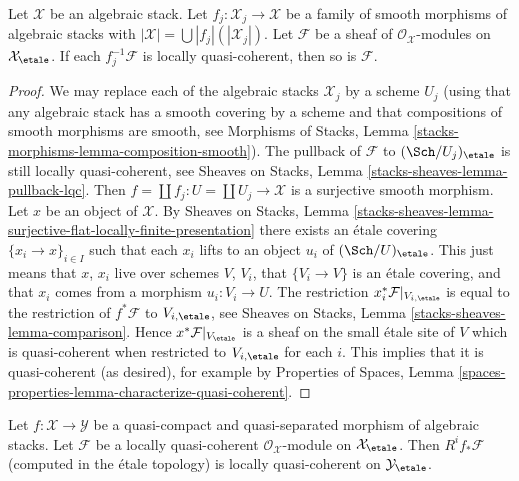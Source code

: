 \begin{lemma}
\label{lemma-check-lqc-on-etale-covering}
Let $\mathcal{X}$ be an algebraic stack. Let
$f_j : \mathcal{X}_j \to \mathcal{X}$ be a family of smooth
morphisms of algebraic stacks with
$|\mathcal{X}| =\bigcup |f_j|(|\mathcal{X}_j|)$.
Let $\mathcal{F}$ be a sheaf of $\mathcal{O}_\mathcal{X}$-modules
on $\mathcal{X}_\etale$. If each $f_j^{-1}\mathcal{F}$
is locally quasi-coherent, then so is $\mathcal{F}$.
\end{lemma}

\begin{proof}
We may replace each of the algebraic stacks $\mathcal{X}_j$ by
a scheme $U_j$ (using that any algebraic stack has a smooth covering by
a scheme and that compositions of smooth morphisms are smooth, see
Morphisms of Stacks, Lemma \ref{stacks-morphisms-lemma-composition-smooth}).
The pullback of $\mathcal{F}$ to $(\Sch/U_j)_\etale$ is still
locally quasi-coherent, see
Sheaves on Stacks, Lemma \ref{stacks-sheaves-lemma-pullback-lqc}.
Then $f = \coprod f_j : U = \coprod U_j \to \mathcal{X}$ is a surjective
smooth morphism. Let $x$ be an object of $\mathcal{X}$. By
Sheaves on Stacks, Lemma
\ref{stacks-sheaves-lemma-surjective-flat-locally-finite-presentation}
there exists an \'etale covering $\{x_i \to x\}_{i \in I}$
such that each $x_i$ lifts to an object $u_i$ of $(\Sch/U)_\etale$.
This just means that $x$, $x_i$ live over schemes $V$, $V_i$, that
$\{V_i \to V\}$ is an \'etale covering, and that $x_i$ comes from
a morphism $u_i : V_i \to U$. The restriction
$x_i^*\mathcal{F}|_{V_{i, \etale}}$ is equal to the restriction
of $f^*\mathcal{F}$ to $V_{i, \etale}$, see
Sheaves on Stacks, Lemma \ref{stacks-sheaves-lemma-comparison}.
Hence $x^*\mathcal{F}|_{V_\etale}$
is a sheaf on the small \'etale site of $V$ which is quasi-coherent
when restricted to $V_{i, \etale}$ for each $i$.
This implies that it is quasi-coherent (as desired), for example by
Properties of Spaces, Lemma
\ref{spaces-properties-lemma-characterize-quasi-coherent}.
\end{proof}

\begin{lemma}
\label{lemma-pushforward-locally-quasi-coherent}
Let $f : \mathcal{X} \to \mathcal{Y}$ be a quasi-compact and
quasi-separated morphism of algebraic stacks. Let 
$\mathcal{F}$ be a locally quasi-coherent
$\mathcal{O}_\mathcal{X}$-module on $\mathcal{X}_\etale$.
Then $R^if_*\mathcal{F}$ (computed in the \'etale topology) is
locally quasi-coherent on $\mathcal{Y}_\etale$.
\end{lemma}

